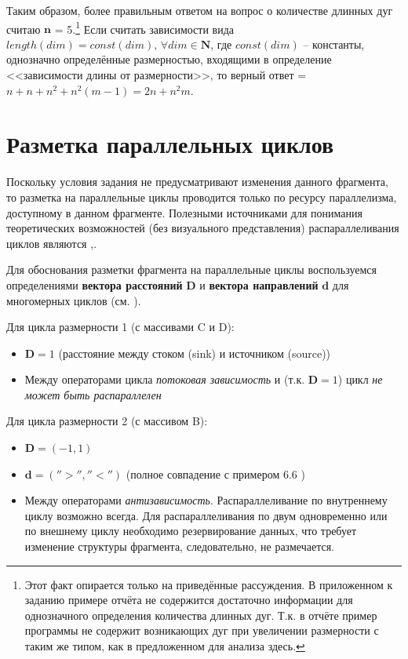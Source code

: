 \documentclass[12pt, fleqn]{article}
\theoremstyle{definition}
\newenvironment{packed_enum}{
\begin{enumerate}
  \setlength{\itemsep}{1pt}
  \setlength{\parskip}{0pt}
  \setlength{\parsep}{0pt}
}{\end{enumerate}}
\begin{document}
\begin{packed_enum}
Таким образом, более правильным ответом на вопрос о количестве длинных дуг считаю $\mathbf{n}$ = 5.\footnote{Этот факт опирается только на приведённые рассуждения. В приложенном к заданию примере отчёта не содержится достаточно информации для однозначного определения количества длинных дуг. Т.к. в отчёте пример программы не содержит возникающих дуг при увеличении размерности с таким же типом, как в предложенном для анализа здесь.}
Если считать зависимости вида $length(dim) = const(dim), \, \forall dim \in \mathbf{N}$, где $const(dim)$ -- константы, однозначно определённые размерностью, входящими в определение <<зависимости длины от размерности>>, то верный ответ = $n + n + n^2 + n^2 (m - 1) = 2n + n^2m$.
\end{packed_enum}

\section{Разметка параллельных циклов}
Поскольку условия задания не предусматривают изменения данного фрагмента, то разметка на параллельные циклы проводится только по ресурсу параллелизма, доступному в данном фрагменте.
Полезными источниками для понимания теоретических возможностей (без визуального представления) распараллеливания циклов являются \cite{lobanov5},\cite{lobanov6}.

Для обоснования разметки фрагмента на параллельные циклы воспользуемся определениями \textbf{вектора расстояний} $\mathbf{D}$ и \textbf{вектора направлений} $\mathbf{d}$ для многомерных циклов (см. \cite{lobanov6}).

Для цикла размерности 1 (с массивами C и D):
\begin{itemize}
 \item $\mathbf{D} = 1$ (расстояние между стоком (sink) и источником (source))
 \item Между операторами цикла \textit{потоковая зависимость} и (т.к. $\mathbf{D} = 1$) цикл \textit{не может быть распараллелен}
\end{itemize}
Для цикла размерности 2 (с массивом B):
\begin{itemize}
 \item $\mathbf{D} = \left(-1, 1\right)$
 \item $\mathbf{d} = \left(''>'', ''<''\right)$ (полное совпадение с примером 6.6 \cite{lobanov6})
 \item Между операторами \textit{антизависимость}. Распараллеливание по внутреннему циклу возможно всегда.
 Для распараллеливания по двум одновременно или по внешнему циклу необходимо резервирование данных, что требует изменение структуры фрагмента, следовательно, не размечается.
\end{itemize}
\end{document}
